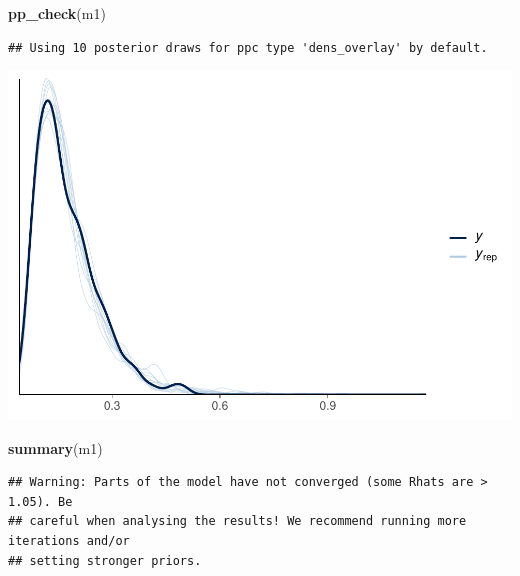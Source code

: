 \documentclass[
]{article}
\newenvironment{Shaded}{\begin{snugshade}}{\end{snugshade}}
\newcommand{\FunctionTok}[1]{\textcolor[rgb]{0.13,0.29,0.53}{\textbf{#1}}}
\newcommand{\NormalTok}[1]{#1}
\begin{document}
\begin{Shaded}
\begin{Highlighting}[]
\FunctionTok{pp\_check}\NormalTok{(m1)}
\end{Highlighting}
\end{Shaded}

\begin{verbatim}
## Using 10 posterior draws for ppc type 'dens_overlay' by default.
\end{verbatim}

\includegraphics{params_analyses_files/figure-latex/unnamed-chunk-2-1.pdf}

\begin{Shaded}
\begin{Highlighting}[]
\FunctionTok{summary}\NormalTok{(m1)}
\end{Highlighting}
\end{Shaded}

\begin{verbatim}
## Warning: Parts of the model have not converged (some Rhats are > 1.05). Be
## careful when analysing the results! We recommend running more iterations and/or
## setting stronger priors.
\end{verbatim}
\end{document}
